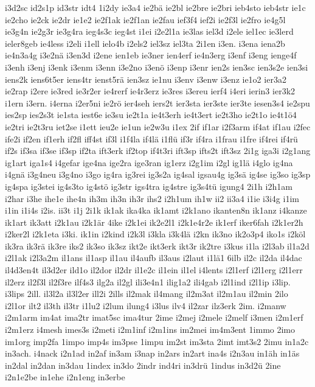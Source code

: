 {i3d2sc
id2s1p
id3str
idt4
1i2dy
ie3a4
ie2bä
ie2bl
ie2bre
ie2bri
ieb4sto
ieb4str
ie1c
ie2cho
ie2ck
ie2dr
ie1e2
ie2f1ak
ie2f1an
ie2fau
ief3f4
ief2i
ie2f3l
ie2fro
ie4g5l
ie3g4n
ie2g3r
ie3g4ra
ieg4s3c
ieg4st
i1ei
i2e2l1a
ie3las
iel3d
i2ele
iel1ec
ie3lerd
ieler8geb
ie4less
i2eli
i1ell
ielo4b
i2els2
iel3sz
iel3ta
2i1en
i3en.
i3ena
iena2b
ie4n3a4g
i3e2nä
i3en3d
i2ene
ien1eb
ie3ner
ien4erf
ie4n3erg
i3enf
i3eng
ienge4f
i3enh
i3enj
i3enk
i3enm
i3enn
i3e2no
i3enö
i3enp
i3enr
ien2s
ien3sc
ien3s2e
ien3si
iens2k
iens6t5er
iens4tr
ienst5rä
ien3sz
ie1nu
i3env
i3enw
i3enz
ie1o2
ier3a2
ie2rap
i2ere
ie3red
ie3r2er
ie4rerf
ie4r3erz
ie3res
i3ereu
ierf4
i4eri
ierin3
ier3k2
i1ern
i3ern.
i4erna
i2er5ni
ie2rö
ier4seh
iers2t
ier3sta
ier3ste
ier3te
iesen3s4
ie2spu
ies2sp
ies2s3t
ie1sta
iest6e
ie3su
ie2t1a
ie4t3erh
ie4t3ert
ie2t3ho
ie2t1o
ie4t1ö4
ie2tri
ie2t3ru
iet2se
i1ett
ieu2e
ie1un
ie2w3u
i1ex
2if
if1ar
i2f3arm
if4at
if1au
i2fec
ife2i
if2en
if1erh
if2fl
iff4st
if3l
i1f4la
if4lä
i1flü
if3r
if4ra
i1frau
i1fre
if4rei
if4rü
if2s
if3sa
if3se
if3sp
if2ta
ift3erk
if2top
if4t3ri
ift3sp
ifts2t
ift3sz
2i1g
iga3i
i2g1ang
ig1art
iga1s4
i4gefar
ige4na
ige2ra
ige3ran
ig1erz
i2g1im
i2gl
ig1lä
i4glo
ig4na
i4gnä
i3g4neu
i3g4no
i3go
ig4ra
ig3rei
ig3s2a
ig4sal
igsau4g
ig3sä
ig4se
ig3so
ig3sp
ig4spa
ig3stei
ig4s3to
ig4stö
ig3str
igs4tra
ig4stre
ig3s4tü
igung4
2i1h
i2h1am
i2har
i3he
ihe1e
ihe4n
ih3m
ih3n
ih3r
ihs2
i2h1um
ih1w
ii2
ii3a4
i1ie
i3i4g
i1im
i1in
i1i4s
i2is.
ii3t
i1j
2i1k
ik1ak
ika4ka
ik1amt
i2k1ano
ikanten8n
ik1anz
i4kanze
ik1art
ik3att
i2k1au
i2k1är
4ike
i2k1ei
ik2e2l1
i2k1e4r2e
ik1erf
iker6fah
i2k1er2h
i2ker2l
i2k1eta
i3ki.
ik1in
i2kind
i2k3l
i3kla
i3k4lä
i2kn
ik3no
ik2o3p4
iko1s
i2köl
ik3ra
ik3rä
ik3re
iks2
ik3so
ik3sz
ikt2e
ikt3erk
ikt3r
ik2tre
i3kus
i1la
i2l3ab
il1a2d
i2l1ak
i2l3a2m
il1ans
il1asp
il1au
il4aufb
il3aus
i2laut
i1lä1
6ilb
il2c
il2da
il4dac
il4d3en4t
il3d2er
ild1o
il2dor
il2dr
il1e2c
il1ein
il1el
i4lents
i2l1erf
i2l1erg
i2l1err
il2erz
il2f3l
il2f3re
ilf4s3
ilg2a
il2gl
ili3e4n1
ilig1a2
ili4gab
i2l1ind
i2l1ip
i3lip.
i3lips
2ill.
il3l2a
il3l2er
ill2i
2ills
il2mak
il4mang
il2m3at
il2m1au
il2min
2ilo
i2l1or
ilt2
il3th
il3tr
i1lu2
i2lum
ilung4
i3lus
ilv4
il2zar
ilz3erk
2im.
i2manw
i2m1arm
im4at
ima2tr
imat5sc
ima4tur
2ime
i2mej
i2mele
i2melf
i3men
i2m1erf
i2m1erz
i4mesh
imes3s
i2meti
i2m1inf
i2m1ins
im2mei
im4m3ent
1immo
2imo
im1org
imp2fa
1impo
imp4s
im3pse
1impu
im2st
im3sta
2imt
imt3s2
2imu
in1a2c
in3ach.
i4nack
i2n1ad
in2af
in3am
i3nap
in2ars
in2art
ina4s
i2n3au
in1äh
in1äs
in2dal
in2dan
in3dau
1index
in3do
2indr
ind4ri
in3drü
1indus
in3d2ü
2ine
i2n1e2be
in1ehe
i2n1eng
in3erbe
}
